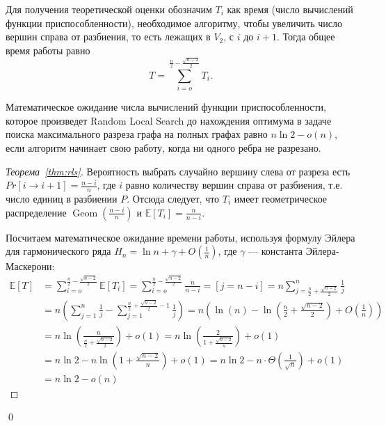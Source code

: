 \documentclass[times]{itmo-student-thesis}
\DeclareMathOperator{\Geom}{Geom}
\begin{document}
Для получения теоретической оценки обозначим $T_i$ как время (число вычислений функции приспособленности), необходимое алгоритму, чтобы увеличить число вершин справа от разбиения, то есть лежащих в $V_2$, с $i$ до $i + 1$.
Тогда общее время работы равно
$$
  T = \sum_{i=o}^{\frac{n}{2} - \frac{\sqrt{n-2}}{2}} T_i.
$$

\begin{theorem} \label{thm:rls}
  Математическое ожидание числа вычислений функции приспособленности, которое произведет Random Local Search до нахождения оптимума в задаче поиска максимального разреза графа на полных графах равно $n\ln 2 - o(n)$, если алгоритм начинает свою работу, когда ни одного ребра не разрезано.
\end{theorem}

\begin{proof}[Теорема~\ref{thm:rls}]
Вероятность выбрать случайно вершину слева от разреза есть $Pr[i \rightarrow i + 1] = \frac{n-i}{n}$, где $i$ равно количеству вершин справа от разбиения, т.е. число единиц в разбиении $P$.
Отсюда следует, что  $T_i$ имеет геометрическое распределение $\Geom(\frac{n-i}{n})$ и $\mathbb{E}[T_i] = \frac{n}{n-i}$.

Посчитаем математическое ожидание времени работы, используя формулу Эйлера для гармонического ряда $H_n = \ln n + \gamma + O(\frac{1}{n})$, где $\gamma$ --- константа Эйлера-Маскерони:
\begin{align*}
    \mathbb{E}[T] &=
                \sum_{i=o}^{\frac{n}{2} - \frac{\sqrt{n-2}}{2}} \mathbb{E}[T_i] =
                \sum_{i=o}^{\frac{n}{2} - \frac{\sqrt{n-2}}{2}} \frac{n}{n-i} = [j = n - i] = n \sum_{j=\frac{n}{2} + \frac{\sqrt{n-2}}{2}}^{n} \frac{1}{j}  \\
        &=      n \left(\sum_{j=1}^{n}\frac{1}{j} - \sum_{j=1}^{\frac{n}{2} +  \frac{\sqrt{n-2}}{2} - 1} \frac{1}{j} \right) =
                n\left(\ln(n) - \ln\left(\frac{n}{2} + \frac{\sqrt{n-2}}{2}\right) + O\left(\frac{1}{n}\right) \right) \\
        &=
                n \ln\left(\frac{n}{\frac{n}{2} + \frac{\sqrt{n-2}}{2}}\right) + o(1) = n \ln\left(\frac{2}{1 + \frac{\sqrt{n-2}}{n}}\right) + o(1) \\
        &= n\ln2 - n\ln\left(1 + \frac{\sqrt{n-2}}{n}\right) + o(1) = n\ln2 - n\cdot\Theta\left(\frac{1}{\sqrt{n}}\right) + o(1) \\
        &= n\ln2 - o(n)
\end{align*}

\end{proof}\qed
\end{document}
